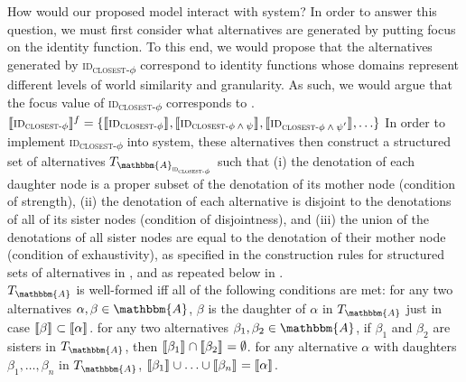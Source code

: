 How would our proposed model interact with  system? In order to answer this question, we must first consider what alternatives are generated by putting focus on the identity function. To this end, we would propose that the alternatives generated by {\scshape id\textsubscript{closest-$\phi$}} correspond to identity functions whose domains represent different levels of world similarity and granularity. As such, we would argue that the focus value of {\scshape id\textsubscript{closest-$\phi$}} corresponds to .
\ex\label{ex:alternativeids}
$\intension[f]{{\scshape id\textsubscript{closest-$\phi$}}}=\{\intension[]{{\scshape id\textsubscript{closest-$\phi$}}},\intension[]{{\scshape id\textsubscript{closest-$\phi\land\psi$}}},\intension[]{{\scshape id\textsubscript{closest-$\phi\land\psi'$}}},\ldots\}$
\xe
In order to implement {{\scshape id\textsubscript{closest-$\phi$}}} into  system, these alternatives then construct a structured set of alternatives $T_{\mathbbm{A}_\text{{\scshape id\textsubscript{closest-$\phi$}}}}$ such that (i) the denotation of each daughter node is a proper subset of the denotation of its mother node (condition of strength), (ii) the denotation of each alternative is disjoint to the denotations of all of its sister nodes (condition of disjointness), and (iii) the union of the denotations of all sister nodes are equal to the denotation of their mother node (condition of exhaustivity), as specified in the construction rules for structured sets of alternatives in , and as repeated below in .
\pex\label{def:alternativeconstruction-repeat1}
\\
$T_\mathbbm{A}$ is well-formed iff all of the following conditions are met:
\a {} for any two alternatives $\alpha,\beta\in\mathbbm{A}$, $\beta$ is the daughter of $\alpha$ in $T_\mathbbm{A}$ just in case $\intension[]{$\beta$}\subset\intension[]{$\alpha$}$.
\a {} for any two alternatives $\beta_1,\beta_2\in\mathbbm{A}$, if $\beta_1$ and $\beta_2$ are sisters in $T_\mathbbm{A}$, then $\intension[]{$\beta_1$}\cap\intension[]{$\beta_2$}=\emptyset$.
\a {} for any alternative $\alpha$ with daughters $\beta_1,\ldots,\beta_n$ in $T_\mathbbm{A}$, $\intension[]{$\beta_1$}\cup\ldots\cup\intension[]{$\beta_n$}=\intension[]{$\alpha$}$.\hfill\parencite[p. 640]{Ippolito2020}
\xe

